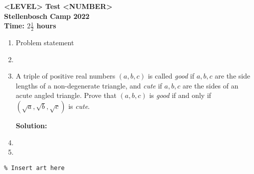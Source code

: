 \documentclass{article}
\begin{document}
\thispagestyle{empty}

\begin{center}
  \textbf{\Large <LEVEL> Test <NUMBER>}
  \\ \vspace{1em}
  \textbf{\large Stellenbosch Camp 2022}
  \\ \vspace{1em}
  \textbf{\large Time: $2\frac{1}{2}$ hours}
\end{center}

\bigskip

\begin{enumerate}[itemsep=\fill]

\item %
Problem statement


\item %


\item %
A triple of positive real numbers $(a,b,c)$ is called \textit{good} if $a,b,c$ are the side lengths of a non-degenerate triangle, and \textit{cute} if $a,b,c$ are the sides of an acute angled triangle. Prove that $(a,b,c)$ is \textit{good} if and only if $(\sqrt{a},\sqrt{b},\sqrt{c})$ is \textit{cute}. 

\textbf{Solution:} 


\item %


\item %

\end{enumerate}


\centering
\small
\begin{BVerbatim}
\end{BVerbatim}
\end{document}
